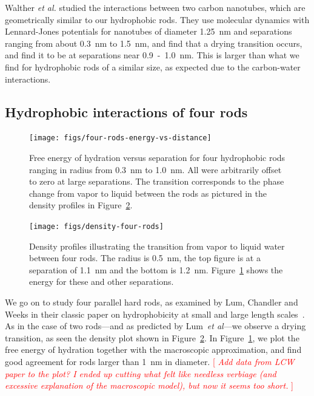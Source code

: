 \documentclass[letterpaper,twocolumn,amsmath,amssymb,prb]{revtex4-1}
\newcommand{\fixme}[1]{\textcolor{red}{[\emph{#1}]}}
\begin{document}
Walther \emph{et al.}\cite{walther2004hydrodynamic} studied the
interactions between two carbon nanotubes, which are geometrically
similar to our hydrophobic rods.  They use molecular dynamics with
Lennard-Jones potentials for nanotubes of diameter 1.25~nm and
separations ranging from about 0.3~nm to 1.5~nm, and find that a
drying transition occurs, and find it to be at separations near
0.9~-~1.0~nm\cite{walther2004hydrodynamic}. This is larger than what
we find for hydrophobic rods of a similar size, as expected due to the
carbon-water interactions.

\subsection{Hydrophobic interactions of four rods}

\begin{figure}
\begin{center}
\texttt{[image: figs/four-rods-energy-vs-distance]}
\end{center}
\caption{ Free energy of hydration 
versus separation for four hydrophobic rods ranging in radius from
0.3~nm to 1.0~nm.
All were arbitrarily offset to zero at large separations. The
transition corresponds to the phase change from
vapor to liquid between the rods as pictured in the density profiles in 
Figure~\ref{fig:density-four-rods}. }
\label{fig:four-rods-energy-vs-distance}
\end{figure}

\begin{figure}
\begin{center}
\texttt{[image: figs/density-four-rods]}
\end{center}
\caption{ Density profiles illustrating the transition from vapor 
to liquid water between four rods. The radius is 0.5~nm, the top figure is 
at a separation of 1.1~nm and the
bottom is 1.2~nm. Figure~\ref{fig:four-rods-energy-vs-distance} shows
the energy for these and other separations.}

\label{fig:density-four-rods}
\end{figure}

We go on to study four parallel hard rods, as examined by Lum,
Chandler and Weeks in their classic paper on hydrophobicity at small
and large length scales~\cite{lum1999hydrophobicity}.  As in the case
of two rods---and as predicted by Lum~\emph{et al}---we observe a
drying transition, as seen the density plot shown in
Figure~\ref{fig:density-four-rods}.  In
Figure~\ref{fig:four-rods-energy-vs-distance}, we plot the free energy
of hydration together with the macroscopic approximation, and find
good agreement for rods larger than 1~nm in diameter.  \fixme{ Add
  data from LCW paper to the plot? I ended up cutting what felt like
  needless verbiage (and excessive explanation of the macroscopic
  model), but now it seems too short. }
\end{document}

